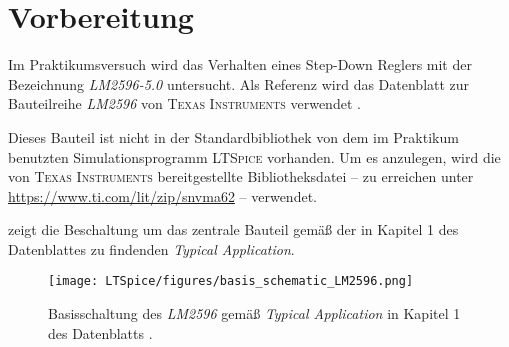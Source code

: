 \chapter{Vorbereitung}
	Im Praktikumsversuch wird das Verhalten eines Step-Down Reglers mit der Bezeichnung \textit{LM2596-5.0} untersucht.
	Als Referenz wird das Datenblatt zur Bauteilreihe \textit{LM2596} von \textsc{Texas Instruments} verwendet \cite{datasheet.LM2596.TexasInstruments.2021}.\par
	Dieses Bauteil ist nicht in der Standardbibliothek von dem im Praktikum benutzten Simulationsprogramm \textsc{LTSpice} vorhanden.
	Um es anzulegen, wird die von \textsc{Texas Instruments} bereitgestellte Bibliotheksdatei -- zu erreichen unter \url{https://www.ti.com/lit/zip/snvma62} --
	verwendet.\par\medskip
	 zeigt die Beschaltung um das zentrale Bauteil gemäß der in Kapitel 1 des Datenblattes zu findenden \textit{Typical Application}.
	\begin{figure}[h]
		\centering
		\texttt{[image: LTSpice/figures/basis\_schematic\_LM2596.png]}
		\caption[Basisschaltung des \textit{LM2596}]{Basisschaltung des \textit{LM2596} gemäß \textit{Typical Application} in Kapitel 1 des Datenblatts \cite{datasheet.LM2596.TexasInstruments.2021}.}
		\label{fig:basisschaltung}
	\end{figure}
